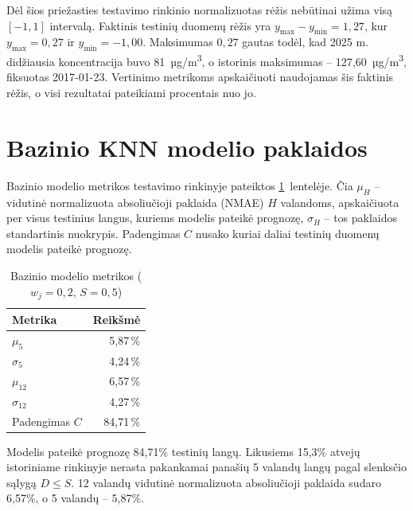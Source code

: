 \documentclass[]{VUMIFTemplateClass}
\begin{document}
    Dėl šios priežasties testavimo rinkinio normalizuotas  rėžis nebūtinai užima visą $[-1, 1]$ intervalą.
    Faktinis testinių duomenų rėžis yra $y_{\max} - y_{\min} = 1{,}27$, kur $y_{\max} = 0{,}27$ ir $y_{\min} = -1{,}00$.
    Maksimumas $0{,}27$ gautas todėl, kad 2025 m. didžiausia  koncentracija buvo 81~µg/m\textsuperscript{3}, o istorinis maksimumas -- 127{,}60~µg/m\textsuperscript{3}, fiksuotas 2017-01-23.
    Vertinimo metrikoms apskaičiuoti naudojamas šis faktinis rėžis, o visi rezultatai pateikiami procentais nuo jo.


    \section{Bazinio KNN modelio paklaidos}

    Bazinio modelio metrikos testavimo rinkinyje pateiktos \ref{tab:baseline}~lentelėje.
    Čia $\mu_H$ -- vidutinė normalizuota absoliučioji paklaida (NMAE) $H$ valandoms, apskaičiuota per visus testinius langus, kuriems modelis pateikė prognozę, $\sigma_H$ -- tos paklaidos standartinis nuokrypis.
    Padengimas $C$ nusako kuriai daliai testinių duomenų modelis pateikė prognozę.
    \begin{table}[H]
        \centering
        \caption{Bazinio modelio metrikos ($w_j = 0{,}2$, $S = 0{,}5$)}
        \small
        \setlength{\tabcolsep}{10pt}
        \begin{tabular}{|l|r|}
            \hline
            \textbf{Metrika} & \textbf{Reikšmė} \\
            \hline
            $\mu_5$          & 5{,}87\,\%       \\
            $\sigma_5$       & 4{,}24\,\%       \\
            $\mu_{12}$       & 6{,}57\,\%       \\
            $\sigma_{12}$    & 4{,}27\,\%       \\
            Padengimas $C$   & 84{,}71\,\%       \\
            \hline
        \end{tabular}
        \label{tab:baseline}
    \end{table}

    Modelis pateikė prognozę 84,71\% testinių langų. Likusiems 15,3\% atvejų istoriniame rinkinyje nerasta pakankamai panašių 5 valandų langų pagal slenksčio sąlygą $D \le S$.
    12 valandų vidutinė normalizuota absoliučioji paklaida sudaro 6,57\%, o 5 valandų -- 5,87\%.
\end{document}
